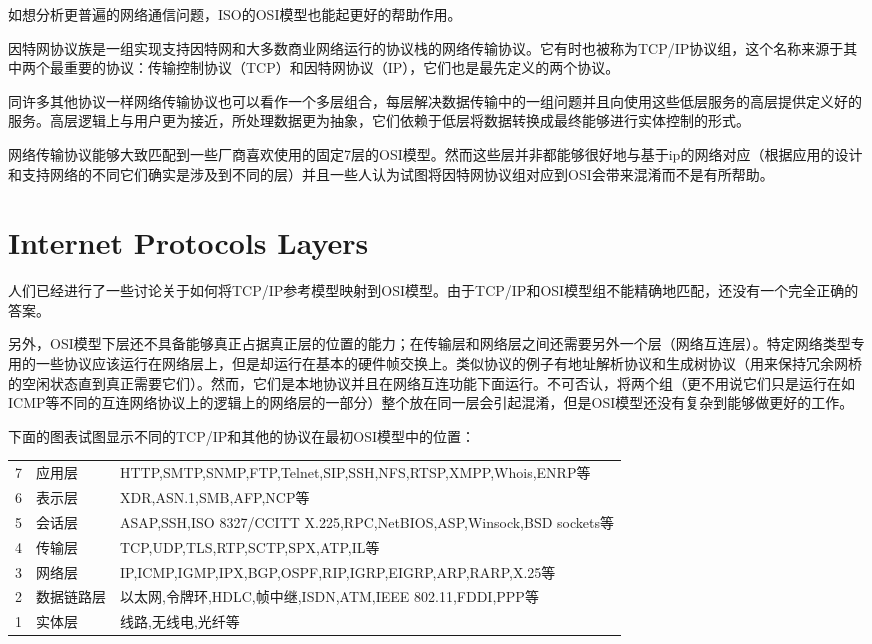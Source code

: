 如想分析更普遍的网络通信问题，ISO的OSI模型也能起更好的帮助作用。

因特网协议族是一组实现支持因特网和大多数商业网络运行的协议栈的网络传输协议。它有时也被称为TCP/IP协议组，这个名称来源于其中两个最重要的协议：传输控制协议（TCP）和因特网协议（IP），它们也是最先定义的两个协议。

同许多其他协议一样网络传输协议也可以看作一个多层组合，每层解决数据传输中的一组问题并且向使用这些低层服务的高层提供定义好的服务。高层逻辑上与用户更为接近，所处理数据更为抽象，它们依赖于低层将数据转换成最终能够进行实体控制的形式。

网络传输协议能够大致匹配到一些厂商喜欢使用的固定7层的OSI模型。然而这些层并非都能够很好地与基于ip的网络对应（根据应用的设计和支持网络的不同它们确实是涉及到不同的层）并且一些人认为试图将因特网协议组对应到OSI会带来混淆而不是有所帮助。


\section{Internet Protocols Layers}

人们已经进行了一些讨论关于如何将TCP/IP参考模型映射到OSI模型。由于TCP/IP和OSI模型组不能精确地匹配，还没有一个完全正确的答案。

另外，OSI模型下层还不具备能够真正占据真正层的位置的能力；在传输层和网络层之间还需要另外一个层（网络互连层）。特定网络类型专用的一些协议应该运行在网络层上，但是却运行在基本的硬件帧交换上。类似协议的例子有地址解析协议和生成树协议（用来保持冗余网桥的空闲状态直到真正需要它们）。然而，它们是本地协议并且在网络互连功能下面运行。不可否认，将两个组（更不用说它们只是运行在如ICMP等不同的互连网络协议上的逻辑上的网络层的一部分）整个放在同一层会引起混淆，但是OSI模型还没有复杂到能够做更好的工作。


下面的图表试图显示不同的TCP/IP和其他的协议在最初OSI模型中的位置：



\begin{table}[!htbp]
\centering
{}
\begin{tabular}{l|l|l|}
\cline{2-3}
7&应用层&{\small HTTP,SMTP,SNMP,FTP,Telnet,SIP,SSH,NFS,RTSP,XMPP,Whois,ENRP等}\\ 
6&表示层&{\small XDR,ASN.1,SMB,AFP,NCP等}\\ 
5&会话层&{\small ASAP,SSH,ISO 8327/CCITT X.225,RPC,NetBIOS,ASP,Winsock,BSD sockets等}\\ 
4&传输层&{\small TCP,UDP,TLS,RTP,SCTP,SPX,ATP,IL等}\\ 
3&网络层&{\small IP,ICMP,IGMP,IPX,BGP,OSPF,RIP,IGRP,EIGRP,ARP,RARP,X.25等}\\ 
2&数据链路层&{\small 以太网,令牌环,HDLC,帧中继,ISDN,ATM,IEEE 802.11,FDDI,PPP等}\\ 
1&实体层&{\small 线路,无线电,光纤等}\\ \cline{2-3}
\end{tabular}
\end{table}


